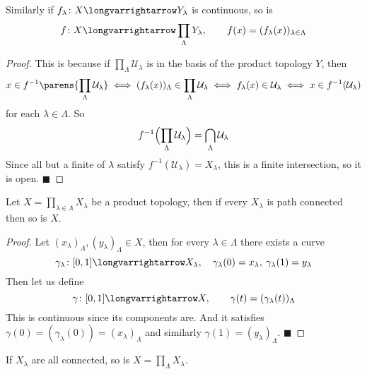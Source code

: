\documentclass[10pt]{article}
\def\qed{\hskip1cm\penalty-100\hbox{}\hfill$\blacksquare$}
\def\mU{\mathcal{U}}
\def\longto{\longvarrightarrow}
\begin{document}
\begin{prop*}

    Similarly if $f_\lambda\colon X\longto Y_\lambda$ is continuous, so is
    \[ f\colon X\longto\prod_\Lambda Y_\lambda,\qquad f(x) = (f_\lambda(x))_{\lambda\in\Lambda} \]

\end{prop*}

\begin{proof}

    This is because if $\prod_\Lambda\mU_\lambda$ is in the basis of the product topology $Y$, then
    \[ x\in f^{-1}\parens{\prod_\Lambda\mU_\lambda} \iff (f_\lambda(x))_\Lambda \in \prod_\Lambda\mU_\lambda \iff f_\lambda(x)\in\mU_\lambda \iff x\in f^{-1}(\mU_\lambda) \]
    for each $\lambda\in\Lambda$.
    So
    \[ f^{-1}\Bigl(\prod_\Lambda\mU_\lambda\Bigr) = \bigcap_\Lambda\mU_\lambda \]
    Since all but a finite of $\lambda$ satisfy $f^{-1}(\mU_\lambda)=X_\lambda$, this is a finite intersection, so it is open.
    \qed

\end{proof}

\begin{prop*}

    Let $X=\prod_{\lambda\in\Lambda}X_\lambda$ be a product topology, then if every $X_\lambda$ is path connected then so is $X$.

\end{prop*}

\begin{proof}

    Let $(x_\lambda)_\Lambda,(y_\lambda)_\Lambda\in X$, then for every $\lambda\in\Lambda$ there exists a curve
    \[ \gamma_\lambda\colon[0,1]\longto X_\lambda,\quad \gamma_\lambda(0)=x_\lambda,\: \gamma_\lambda(1)=y_\lambda \]
    Then let us define
    \[ \gamma\colon[0,1]\longto X,\qquad \gamma(t) = (\gamma_\lambda(t))_\Lambda \]
    This is continuous since its components are.
    And it satisfies $\gamma(0)=(\gamma_\lambda(0))=(x_\lambda)_\Lambda$ and similarly $\gamma(1)=(y_\lambda)_\Lambda$.
    \qed

\end{proof}

\begin{prop*}

    If $X_\lambda$ are all connected, so is $X=\prod_\Lambda X_\lambda$.

\end{prop*}
\end{document}
